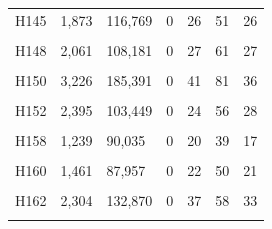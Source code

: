 \documentclass[
  a4paper,
  titlepage]{article}
\begin{document}
\begin{longtable}[t]{lllllll}
H145 & 1,873 & 116,769 & 0 & 26 & 51 & 26\\
 
\cellcolor{gray!6}{H146} & \cellcolor{gray!6}{2,173} & \cellcolor{gray!6}{114,691} & \cellcolor{gray!6}{0} & \cellcolor{gray!6}{29} & \cellcolor{gray!6}{53} & \cellcolor{gray!6}{21}\\
 
H148 & 2,061 & 108,181 & 0 & 27 & 61 & 27\\
 
\cellcolor{gray!6}{H149} & \cellcolor{gray!6}{1,736} & \cellcolor{gray!6}{106,314} & \cellcolor{gray!6}{0} & \cellcolor{gray!6}{29} & \cellcolor{gray!6}{38} & \cellcolor{gray!6}{21}\\
 
H150 & 3,226 & 185,391 & 0 & 41 & 81 & 36\\
 
\cellcolor{gray!6}{H151} & \cellcolor{gray!6}{2,933} & \cellcolor{gray!6}{161,022} & \cellcolor{gray!6}{0} & \cellcolor{gray!6}{34} & \cellcolor{gray!6}{92} & \cellcolor{gray!6}{38}\\
 
H152 & 2,395 & 103,449 & 0 & 24 & 56 & 28\\
 
\cellcolor{gray!6}{H157} & \cellcolor{gray!6}{1,530} & \cellcolor{gray!6}{109,981} & \cellcolor{gray!6}{0} & \cellcolor{gray!6}{16} & \cellcolor{gray!6}{47} & \cellcolor{gray!6}{19}\\
 
H158 & 1,239 & 90,035 & 0 & 20 & 39 & 17\\
 
\cellcolor{gray!6}{H159} & \cellcolor{gray!6}{2,478} & \cellcolor{gray!6}{124,619} & \cellcolor{gray!6}{0} & \cellcolor{gray!6}{28} & \cellcolor{gray!6}{68} & \cellcolor{gray!6}{29}\\
 
H160 & 1,461 & 87,957 & 0 & 22 & 50 & 21\\
 
\cellcolor{gray!6}{H161} & \cellcolor{gray!6}{1,512} & \cellcolor{gray!6}{113,445} & \cellcolor{gray!6}{0} & \cellcolor{gray!6}{25} & \cellcolor{gray!6}{49} & \cellcolor{gray!6}{19}\\
 
H162 & 2,304 & 132,870 & 0 & 37 & 58 & 33\\
 
\cellcolor{gray!6}{H164} & \cellcolor{gray!6}{3,395} & \cellcolor{gray!6}{175,333} & \cellcolor{gray!6}{0} & \cellcolor{gray!6}{37} & \cellcolor{gray!6}{85} & \cellcolor{gray!6}{39}\\
 

\end{longtable}
\end{document}
